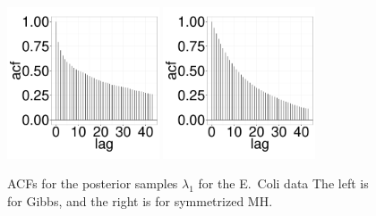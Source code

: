 {  \begin{figure}[H]
  \centering
  \begin{minipage}[!hp]{0.99\linewidth}
    \includegraphics [width=0.40\textwidth, angle=0]{figs/ecoli_ks/ecoli_l1gbsacf_31_3_0_.pdf}
	\hspace{.5in}
    \includegraphics [width=0.40\textwidth, angle=0]{figs/ecoli_ks/ecoli_l1mhacf_31_3_0_.pdf}
  \end{minipage}

    \caption{ACFs for the posterior samples $\lambda_1$ for the E.\ Coli data The left is for Gibbs, and the right is for symmetrized MH.}
     \label{fig:ACF_ECOLI_l1}
  \end{figure}

}
